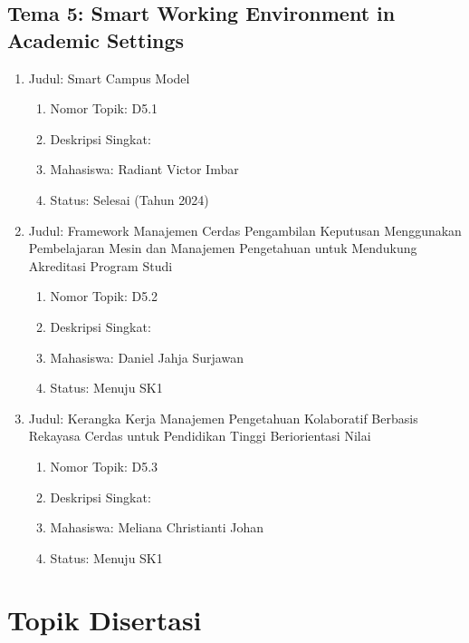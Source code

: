 \documentclass[
  letterpaper,
  DIV=11,
  numbers=noendperiod]{scrreprt}
\providecommand{\tightlist}{%
  \setlength{\itemsep}{0pt}\setlength{\parskip}{0pt}}
\begin{document}
\section{Tema 5: Smart Working Environment in Academic
Settings}\label{tema-5-smart-working-environment-in-academic-settings-1}

\begin{enumerate}
\def\labelenumi{\arabic{enumi}.}
\tightlist
\item
  Judul: Smart Campus Model

  \begin{enumerate}
  \def\labelenumii{\arabic{enumii}.}
  \tightlist
  \item
    Nomor Topik: D5.1
  \item
    Deskripsi Singkat:
  \item
    Mahasiswa: Radiant Victor Imbar
  \item
    Status: Selesai (Tahun 2024)
  \end{enumerate}
\item
  Judul: Framework Manajemen Cerdas Pengambilan Keputusan Menggunakan
  Pembelajaran Mesin dan Manajemen Pengetahuan untuk Mendukung
  Akreditasi Program Studi

  \begin{enumerate}
  \def\labelenumii{\arabic{enumii}.}
  \tightlist
  \item
    Nomor Topik: D5.2
  \item
    Deskripsi Singkat:
  \item
    Mahasiswa: Daniel Jahja Surjawan
  \item
    Status: Menuju SK1
  \end{enumerate}
\item
  Judul: Kerangka Kerja Manajemen Pengetahuan Kolaboratif Berbasis
  Rekayasa Cerdas untuk Pendidikan Tinggi Beriorientasi Nilai

  \begin{enumerate}
  \def\labelenumii{\arabic{enumii}.}
  \tightlist
  \item
    Nomor Topik: D5.3
  \item
    Deskripsi Singkat:
  \item
    Mahasiswa: Meliana Christianti Johan
  \item
    Status: Menuju SK1
  \end{enumerate}
\end{enumerate}


\chapter{Topik Disertasi}\label{topik-disertasi-1}
\end{document}
